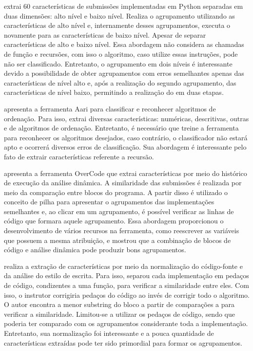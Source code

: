 	 extrai 60 características de submissões implementadas
	em Python separadas em duas dimensões: alto nível e baixo nível. Realiza o agrupamento
	utilizando as características de alto nível e, internamente desses agrupamentos,
	executa o  novamente para as características de baixo nível. Apesar
	de separar características de alto e baixo nível. Essa abordagem não considera as
	chamadas de função e recursões, com isso o algoritmo, caso utilize essas instruções,
	pode não ser classificado. Entretanto, o agrupamento em dois níveis é interessante
	devido a possibilidade de obter agrupamentos com erros semelhantes apenas das
	características de nível alto e, após a realização do segundo agrupamento, das
	características de nível baixo, permitindo a realização do  em
	duas etapas.
	
	 apresenta a ferramenta Aari para classificar e reconhecer
	algoritmos de ordenação. Para isso, extrai diversas características: numéricas,
	descritivas, outras e de algoritmos de ordenação. Entretanto, é necessário que
	treine a ferramenta para reconhecer os algoritmos desejados, caso contrário, o
	classificador não estará apto e ocorrerá diversos erros de classificação. Sua
	abordagem é interessante pelo fato de extrair características referente a recursão.
	
	 apresenta a ferramenta OverCode que extrai características
	por meio do histórico de execução da análise dinâmica. A similaridade das submissões
	é realizada por meio da comparação entre blocos do programa. A partir disso é utilizado
	o conceito de pilha para apresentar o agrupamentos das implementações semelhantes e,
	ao clicar em um agrupamento, é possível verificar as linhas de código que formara
	aquele agrupamento. Essa abordagem proporcionou o desenvolvimento de vários recursos
	na ferramenta, como reescrever as variáveis que possuem a mesma atribuição, e mostrou
	que a combinação de blocos de código e análise dinâmica pode produzir bons agrupamentos.
	
	 realiza a extração de características por meio da normalização
	do código-fonte e da análise do estilo de escrita. Para isso, separou cada implementação
	em pedaços de código, condizentes a uma função, para verificar a similaridade entre eles.
	Com isso, o instrutor corrigiria pedaços do código ao invés de corrigir todo o algoritmo.
	O autor encontra a menor substring do bloco a partir de comparações  a
	 para verificar a similaridade. Limitou-se a utilizar os pedaços de
	código, sendo que poderia ter comparado com os agrupamentos considerante toda a
	implementação. Entretanto, sua normalização foi interessante e a pouca quantidade de
	características extraídas pode ter sido primordial para formar os agrupamentos.
	
